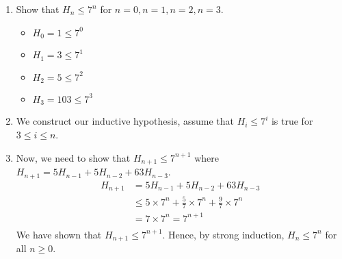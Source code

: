\documentclass[12pt]{article}
\begin{document}
\begin{enumerate}
	\item Show that $H_n \leq 7^n$ for $n=0,n=1,n=2,n=3$.
		\begin{itemize}
			\item $H_0 = 1 \leq 7^0$
			\item $H_1 = 3 \leq 7^1$
			\item $H_2 = 5 \leq 7^2$
			\item $H_3 = 103 \leq 7^3$
		\end{itemize}
	\item We construct our inductive hypothesis, assume that $H_i \leq 7^i$ is true for $3 \leq i \leq n$.
	\item Now, we need to show that $H_{n+1} \leq 7^{n+1}$ where $H_{n+1} = 5H_{n-1} + 5H_{n-2} + 63H_{n-3}$.
	\begin{align*}
		H_{n+1} &= 5H_{n-1} + 5H_{n-2} + 63H_{n-3}\\
			&\leq 5\times 7^n + \frac{5}{7}\times 7^n + \frac{9}{7}\times 7^n \\
			&= 7\times 7^n = 7^{n+1}\\
	\end{align*}
		We have shown that $H_{n+1} \leq 7^{n+1}$. Hence, by strong induction, $H_n \leq 7^n$ for all $n \geq 0$.\\

\end{enumerate}
\end{document}

